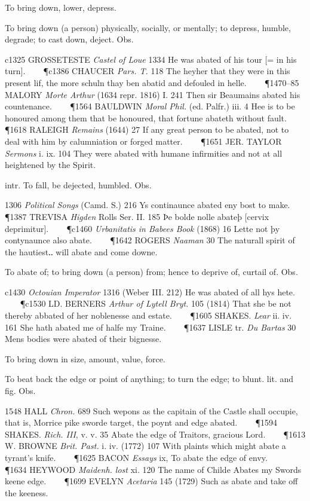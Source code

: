 \begin{description}[wide, labelwidth=!, labelindent=0pt]
\begin{myenumerate}
 To bring down, lower, depress. 

 To bring down (a person) physically, socially, or mentally; 
to depress, humble, degrade; to cast down, deject. Obs. 

c1325 GROSSETESTE \textit{Castel of Loue} 1334 He was abated of his tour 
[= in his turn].    
\P c1386 CHAUCER \textit{Pars. T.} 118 The heyher that they were in this 
present lif, the more schuln thay ben abatid and defouled in helle.    
\P 1470–85 MALORY \textit{Morte Arthur} (1634 repr. 1816) I. 241 Then sir 
Beaumains abated his countenance.    
\P 1564 BAULDWIN \textit{Moral Phil.} (ed. Palfr.) iii. 4 Hee is to be 
honoured among them that be honoured, that fortune abateth without fault.    
\P 1618 RALEIGH \textit{Remains} (1644) 27 If any great person to be 
abated, not to deal with him by calumniation or forged matter.    
\P 1651 JER. TAYLOR \textit{Sermons} i. ix. 104 They were abated with 
humane infirmities and not at all heightened by the Spirit.

 intr. To fall, be dejected, humbled. Obs. 

1306 \textit{Political Songs} (Camd. S.) 216 Ys continaunce abated eny 
bost to make.    
\P 1387 TREVISA \textit{Higden} Rolls Ser. II. 185 Þe bolde nolle abateþ 
[cervix deprimitur].    
\P c1460 \textit{Urbanitatis in Babees Book} (1868) 16 Lette not þy 
contynaunce also abate.    
\P 1642 ROGERS \textit{Naaman} 30 The naturall spirit of the hautiest‥
will abate and come downe.

 To abate of; to bring down (a person) from; hence to deprive 
of, curtail of. Obs. 

c1430 \textit{Octouian Imperator} 1316 (Weber III. 212) He was abated of 
all hys hete.    
\P c1530 LD. BERNERS \textit{Arthur of Lytell Bryt.} 105 (1814) That she 
be not thereby abbated of her noblenesse and estate.    
\P 1605 SHAKES. \textit{Lear} ii. iv. 161 She hath abated me of halfe my 
Traine.    
\P 1637 LISLE tr. \textit{Du Bartas} 30 Mens bodies were abated of their 
bignesse.

 To bring down in size, amount, value, force. 

 To beat back the edge or point of anything; to turn the edge; 
to blunt. lit. and fig. Obs. 

1548 HALL \textit{Chron.} 689 Such wepons as the capitain of the Castle shall 
occupie, that is, Morrice pike sworde target, the poynt and edge abated.    
\P 1594 SHAKES. \textit{Rich. III}, v. v. 35 Abate the edge of Traitors, 
gracious Lord.    
\P 1613 W. BROWNE \textit{Brit. Past.} i. iv. (1772) 107 With plaints which 
might abate a tyrant's knife.    
\P 1625 BACON \textit{Essays} ix, To abate the edge of envy.    
\P 1634 HEYWOOD \textit{Maidenh. lost} xi. 120 The name of Childe Abates my 
Swords keene edge.    
\P 1699 EVELYN \textit{Acetaria} 145 (1729) Such as abate and take off the 
keeness.


\end{myenumerate}
\end{description}
